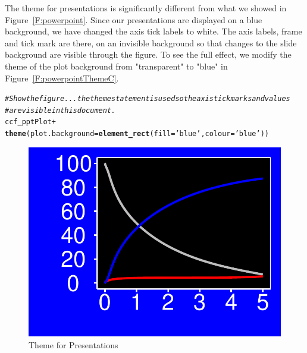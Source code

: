 \documentclass[nojss]{jss}\usepackage[]{graphicx}\usepackage[]{color}
\makeatletter
\def\maxwidth{ %
  \ifdim\Gin@nat@width>\linewidth
    \linewidth
  \else
    \Gin@nat@width
  \fi
}
\newcommand{\hlstr}[1]{\textcolor[rgb]{0.192,0.494,0.8}{#1}}%
\newcommand{\hlcom}[1]{\textcolor[rgb]{0.678,0.584,0.686}{\textit{#1}}}%
\newcommand{\hlopt}[1]{\textcolor[rgb]{0,0,0}{#1}}%
\newcommand{\hlstd}[1]{\textcolor[rgb]{0.345,0.345,0.345}{#1}}%
\newcommand{\hlkwc}[1]{\textcolor[rgb]{0.333,0.667,0.333}{#1}}%
\newcommand{\hlkwd}[1]{\textcolor[rgb]{0.737,0.353,0.396}{\textbf{#1}}}%
\newenvironment{kframe}{%
 \def\at@end@of@kframe{}%
 \ifinner\ifhmode%
  \def\at@end@of@kframe{\end{minipage}}%
  \begin{minipage}{\columnwidth}%
 \fi\fi%
 \def\FrameCommand##1{\hskip\@totalleftmargin \hskip-\fboxsep
 \colorbox{shadecolor}{##1}\hskip-\fboxsep
     \hskip-\linewidth \hskip-\@totalleftmargin \hskip\columnwidth}%
 \MakeFramed {\advance\hsize-\width
   \@totalleftmargin\z@ \linewidth\hsize
   \@setminipage}}%
 {\par\unskip\endMakeFramed%
 \at@end@of@kframe}
\newenvironment{knitrout}{}{} %
\makeatother
\begin{document}
The theme for presentations is significantly different from what we showed in Figure~\ref{F:powerpoint}. Since our presentations are displayed on a blue background, we have changed the axis tick labels to white. The axis labels, frame and tick mark are there, on an invisible background so that changes to the slide background are visible through the figure.  To see the full effect, we modify the theme of the plot background from "transparent" to "blue" in Figure~\ref{F:powerpointThemeC}.
\begin{knitrout}\footnotesize
{}\color{fgcolor}\begin{kframe}
\begin{alltt}
\hlcom{# Show the figure... the theme statement is used so the axis tick marks and values}
\hlcom{# are visible in this document.}
\hlstd{ccf_pptPlot} \hlopt{+}
  \hlkwd{theme}\hlstd{(}\hlkwc{plot.background} \hlstd{=} \hlkwd{element_rect}\hlstd{(}\hlkwc{fill}\hlstd{=}\hlstr{'blue'}\hlstd{,} \hlkwc{colour}\hlstd{=}\hlstr{'blue'}\hlstd{))}
\end{alltt}
\end{kframe}\begin{figure}[htpb]

{\centering \includegraphics[width=\maxwidth]{figure/beamer-powerpointTheme-1} 

}

\caption[Theme for Presentations]{Theme for Presentations\label{F:powerpointTheme}}
\end{figure}


\end{knitrout}
\end{document}
